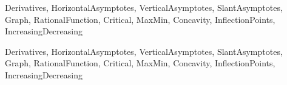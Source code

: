 \begin{tagblock}{Derivatives, HorizontalAsymptotes, VerticalAsymptotes, SlantAsymptotes, Graph, RationalFunction, Critical, MaxMin, Concavity, InflectionPoints, IncreasingDecreasing  }
\begin{question}
\begin{enumerate}
\end{enumerate}


	
\begin{tags}
	   Derivatives, HorizontalAsymptotes, VerticalAsymptotes, SlantAsymptotes, Graph, RationalFunction, Critical, MaxMin, Concavity, InflectionPoints, IncreasingDecreasing

\end{tags}
	
\begin{diary}
\end{diary}
	
\begin{solution}
	   
\end{solution}
	
\end{question}

\end{tagblock}


